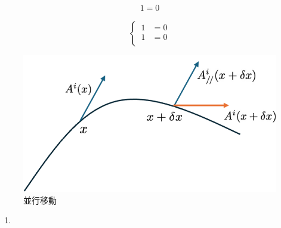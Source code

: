 \documentclass[dvipdfmx]{report} %
\begin{document}
\begin{tcolorbox}[title=メモ用]
\begin{eqnarray*}
	1 = 0
\end{eqnarray*}
\end{tcolorbox}

\begin{equation}
\left\{ \,
\begin{aligned}
	1 &= 0\\
	1 &= 0\\
\end{aligned}
\right.
\end{equation}

\begin{figure}[H]
    \centering
    \includegraphics[width=0.5\columnwidth]{./images/0106/01.png}
    \caption{並行移動}
    \label{}
\end{figure}

\begin{enumerate}[(1)\,]
\item{}
\end{enumerate}
\end{document}
